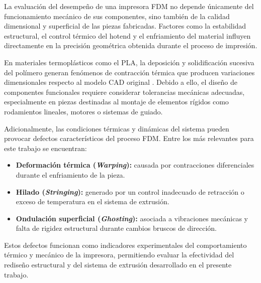 La evaluación del desempeño de una impresora FDM no depende únicamente del funcionamiento mecánico de sus componentes, sino también de la calidad dimensional y superficial de las piezas fabricadas. Factores como la estabilidad estructural, el control térmico del hotend y el enfriamiento del material influyen directamente en la precisión geométrica obtenida durante el proceso de impresión.

En materiales termoplásticos como el PLA, la deposición y solidificación sucesiva del polímero generan fenómenos de contracción térmica que producen variaciones dimensionales respecto al modelo CAD original \cite{gibson2021}. Debido a ello, el diseño de componentes funcionales requiere considerar tolerancias mecánicas adecuadas, especialmente en piezas destinadas al montaje de elementos rígidos como rodamientos lineales, motores o sistemas de guiado.

Adicionalmente, las condiciones térmicas y dinámicas del sistema pueden provocar defectos característicos del proceso FDM. Entre los más relevantes para este trabajo se encuentran:

\begin{itemize}
    \item \textbf{Deformación térmica (\textit{Warping}):} causada por contracciones diferenciales durante el enfriamiento de la pieza.
    
    \item \textbf{Hilado (\textit{Stringing}):} generado por un control inadecuado de retracción o exceso de temperatura en el sistema de extrusión\cite{creality_stringing_guide}.
    
    \item \textbf{Ondulación superficial (\textit{Ghosting}):} asociada a vibraciones mecánicas y falta de rigidez estructural durante cambios bruscos de dirección.
\end{itemize}

Estos defectos funcionan como indicadores experimentales del comportamiento térmico y mecánico de la impresora, permitiendo evaluar la efectividad del rediseño estructural y del sistema de extrusión desarrollado en el presente trabajo.


